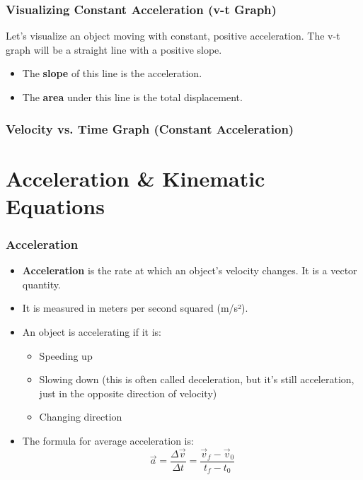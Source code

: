 \documentclass{beamer}
\begin{document}
\begin{frame}
\frametitle{Visualizing Constant Acceleration (v-t Graph)}
Let's visualize an object moving with constant, positive acceleration. The v-t graph will be a straight line with a positive slope.
\begin{itemize}
    \item The \textbf{slope} of this line is the acceleration.
    \item The \textbf{area} under this line is the total displacement.
\end{itemize}
\end{frame}

\begin{frame}
\frametitle{Velocity vs. Time Graph (Constant Acceleration)}
\begin{figure}
\end{figure}
\end{frame}

\section{Acceleration \& Kinematic Equations}

\begin{frame}
\frametitle{Acceleration}
\begin{itemize}
    \item \textbf{Acceleration} is the rate at which an object's velocity changes. It is a \alert{vector} quantity.
    \item It is measured in meters per second squared (m/s²).
    \item An object is accelerating if it is:
    \begin{itemize}
        \item Speeding up
        \item Slowing down (this is often called deceleration, but it's still acceleration, just in the opposite direction of velocity)
        \item Changing direction
    \end{itemize}
    \item The formula for average acceleration is:
    \[ \vec{a} = \frac{\Delta \vec{v}}{\Delta t} = \frac{\vec{v}_f - \vec{v}_0}{t_f - t_0} \]
\end{itemize}
\end{frame}
\end{document}
